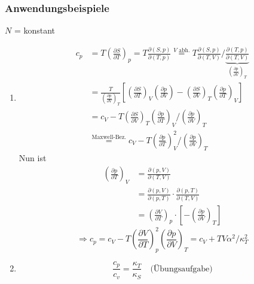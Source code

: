 \subsubsection{Anwendungsbeispiele} $N$ = konstant
\begin{enumerate}  %
  \item
  \begin{equation}
  \begin{split}
    c_p &=  T \left( \frac{\partial S}{\partial T} \right)_p = T \frac{\partial(S, p)}{\partial(T, p)} \overset{\text{$V$ abh.}}{=}
    T \frac{\partial(S, p)}{\partial(T, V)} / \underbrace{\frac{\partial(T, p)}{\partial(T, V)}}_{ \left( \frac{\partial p}{\partial V} \right)_T} \\ 
    &= \frac{T}{ \left( \frac{\partial p}{\partial V} \right)_T} \left[ \left( \frac{\partial S}{\partial T} \right)_V 
    \left( \frac{\partial p}{\partial V} \right) - \left( \frac{\partial S}{\partial V} \right)_T \left( \frac{\partial p}{\partial T} \right)_V \right] \\
    &= c_V - T \left( \frac{\partial S}{\partial V} \right)_T \left( \frac{\partial p}{\partial T} \right)_V / \left( \frac{\partial p}{\partial V} \right)_T \\
    &\overset{\text{Maxwell-Bez.}}{=} c_V - T \left( \frac{\partial p}{\partial T} \right)_V^2 / \left( \frac{\partial p}{\partial V} \right)_T
  \end{split}
  \end{equation}
  Nun ist
  \begin{equation}
  \begin{split}
    \left( \frac{\partial p}{\partial T} \right)_V &= \frac{\partial(p, V)}{\partial (T, V)} \\
     &= \frac{\partial (p, V)}{\partial (p, T)} \cdot \frac{\partial(p, T)}{\partial(T, V)} \\
     &= \left( \frac{\partial V}{\partial T} \right)_p \cdot \left[ - \left( \frac{\partial p}{\partial V} \right)_T \right]
  \end{split}
  \end{equation}
  \begin{equation}
    \Rightarrow c_p = c_V - T \left( \frac{\partial V}{\partial T} \right)_p^2 \left( \frac{\partial p}{\partial V} \right)_T = c_V + T V \alpha^2 / \kappa_T^2
  \end{equation}
  \item 
  \begin{equation}
    \frac{c_p}{c_v} = \frac{\kappa_T}{\kappa_S} \quad \text{(Übungsaufgabe)}
  \end{equation}
\end{enumerate}
